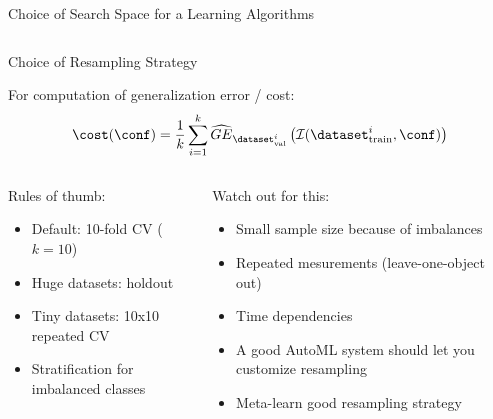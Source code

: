 \begin{frame}{Choice of Search Space for a Learning Algorithms}
\begin{columns}
		\end{columns}
	  \end{frame}
	  
	  \begin{frame}{Choice of Resampling Strategy}
		
		For computation of generalization error / cost:
		\begin{equation*}
		  \cost(\conf) = \frac{1}{k}\sum_{i = 1}^k \widehat{GE}_{\dataset_{\text{val}}^i}\left(\inducer(\dataset_{\text{train}}^i, \conf)\right)
		\end{equation*}
	  
		\vspace{1em}
		\begin{columns}
		  \begin{column}{0.5\textwidth}
		  Rules of thumb:
		  \begin{itemize}
			\item Default: 10-fold CV ($k=10$)
			\item Huge datasets: holdout
			\item Tiny datasets: 10x10 repeated CV
			\item Stratification for imbalanced classes
		  \end{itemize}
		  \end{column}
		  
		  \begin{column}{0.5\textwidth}
	   Watch out for this:       
		  \begin{itemize}
			\item Small sample size because of imbalances    
			\item Repeated mesurements (leave-one-object out)
			\item Time dependencies
			\item A good AutoML system should let you customize resampling
			\item Meta-learn good resampling strategy~
		  \end{itemize}
		  \end{column}
		  \end{columns}
		  
	  \end{frame}
	  
